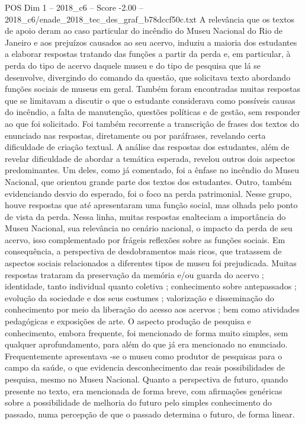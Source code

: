\begin{textsample}{POS Dim 1 – 2018\_c6 – Score -2.00 – 2018\_c6/enade\_2018\_tec\_des\_graf\_b78dccf50c.txt}
A relevância que os textos de apoio deram ao caso particular do incêndio do Museu Nacional do Rio de Janeiro e aos prejuízos causados ao seu acervo, induziu a maioria dos estudantes a elaborar respostas tratando das funções a partir da perda e, em particular, à perda do tipo de acervo daquele museu e do tipo de pesquisa que lá se desenvolve, divergindo do comando da questão, que solicitava texto abordando funções sociais de museus em geral.
Também foram encontradas muitas respostas que se limitavam a discutir o que o estudante considerava como possíveis causas do incêndio, a falta de manutenção, questões políticas e de gestão, sem responder ao que foi solicitado.
Foi também recorrente a transcrição de frases dos textos do enunciado nas respostas, diretamente ou por paráfrases, revelando certa dificuldade de criação textual.
A análise das respostas dos estudantes, além de revelar dificuldade de abordar a temática esperada, revelou outros dois aspectos predominantes.
Um deles, como já comentado, foi a ênfase no incêndio do Museu Nacional, que orientou grande parte dos textos dos estudantes.
Outro, também evidenciando desvio do esperado, foi o foco na perda patrimonial.
Nesse grupo, houve respostas que até apresentaram uma função social, mas olhada pelo ponto de vista da perda.
Nessa linha, muitas respostas enalteciam a importância do Museu Nacional, sua relevância no cenário nacional, o impacto da perda de seu acervo, isso complementado por frágeis reflexões sobre as funções sociais.
Em consequência, a perspectiva de desdobramentos mais ricos, que tratassem de aspectos sociais relacionados a diferentes tipos de museu foi prejudicada.
Muitas respostas trataram da preservação da memória e/ou guarda do acervo ; identidade, tanto individual quanto coletiva ; conhecimento sobre antepassados ; evolução da sociedade e dos seus costumes ; valorização e disseminação do conhecimento por meio da liberação do acesso aos acervos ; bem como atividades pedagógicas e exposições de arte.
O aspecto produção de pesquisa e conhecimento, embora frequente, foi mencionado de forma muito simples, sem qualquer aprofundamento, para além do que já era mencionado no enunciado.
Frequentemente apresentava -se o museu como produtor de pesquisas para o campo da saúde, o que evidencia desconhecimento das reais possibilidades de pesquisa, mesmo no Museu Nacional.
Quanto a perspectiva de futuro, quando presente no texto, era mencionada de forma breve, com afirmações genéricas sobre a possibilidade de melhoria do futuro pelo simples conhecimento do passado, numa percepção de que o passado determina o futuro, de forma linear.

\end{textsample}
